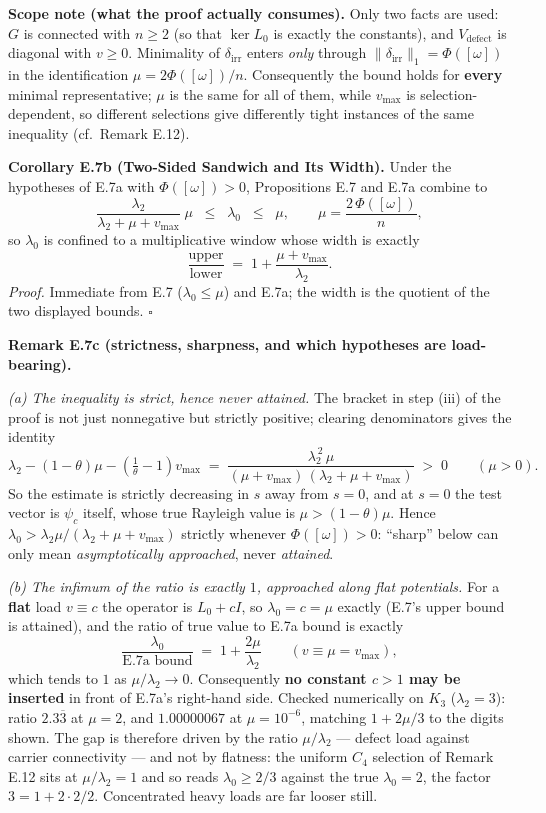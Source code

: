 \documentclass[
]{article}
\begin{document}
\textbf{Scope note (what the proof actually consumes).} Only two facts are used: \(G\) is connected with \(n \ge 2\) (so that \(\ker L_0\) is exactly the constants), and \(V_{\mathrm{defect}}\) is diagonal with \(v \ge 0\). Minimality of \(\delta_{\mathrm{irr}}\) enters \emph{only} through \(\|\delta_{\mathrm{irr}}\|_1 = \Phi([\omega])\) in the identification \(\mu = 2\Phi([\omega])/n\). Consequently the bound holds for \textbf{every} minimal representative; \(\mu\) is the same for all of them, while \(v_{\max}\) is selection-dependent, so different selections give differently tight instances of the same inequality (cf.~Remark E.12).

\textbf{Corollary E.7b (Two-Sided Sandwich and Its Width).} Under the hypotheses of E.7a with \(\Phi([\omega]) > 0\), Propositions E.7 and E.7a combine to
\[\frac{\lambda_2}{\lambda_2+\mu+v_{\max}}\;\mu \;\;\le\;\; \lambda_0 \;\;\le\;\; \mu, \qquad \mu = \frac{2\,\Phi([\omega])}{n},\]
so \(\lambda_0\) is confined to a multiplicative window whose width is exactly
\[\frac{\text{upper}}{\text{lower}} \;=\; 1 + \frac{\mu + v_{\max}}{\lambda_2}.\]
\emph{Proof.} Immediate from E.7 (\(\lambda_0 \le \mu\)) and E.7a; the width is the quotient of the two displayed bounds. \(\square\)

\textbf{Remark E.7c (strictness, sharpness, and which hypotheses are load-bearing).}

\emph{(a) The inequality is strict, hence never attained.} The bracket in step (iii) of the proof is not just nonnegative but strictly positive; clearing denominators gives the identity
\[\lambda_2 - (1-\theta)\mu - \left(\tfrac1\theta-1\right)v_{\max} \;=\; \frac{\lambda_2^{\,2}\,\mu}{(\mu+v_{\max})\,(\lambda_2+\mu+v_{\max})} \;>\; 0 \qquad (\mu > 0).\]
So the estimate is strictly decreasing in \(s\) away from \(s=0\), and at \(s=0\) the test vector is \(\psi_c\) itself, whose true Rayleigh value is \(\mu > (1-\theta)\mu\). Hence \(\lambda_0 > \lambda_2\mu/(\lambda_2+\mu+v_{\max})\) strictly whenever \(\Phi([\omega])>0\): ``sharp'' below can only mean \emph{asymptotically approached}, never \emph{attained}.

\emph{(b) The infimum of the ratio is exactly \(1\), approached along flat potentials.} For a \textbf{flat} load \(v \equiv c\) the operator is \(L_0 + cI\), so \(\lambda_0 = c = \mu\) exactly (E.7's upper bound is attained), and the ratio of true value to E.7a bound is exactly
\[\frac{\lambda_0}{\text{E.7a bound}} \;=\; 1 + \frac{2\mu}{\lambda_2} \qquad (v \equiv \mu = v_{\max}),\]
which tends to \(1\) as \(\mu/\lambda_2 \to 0\). Consequently \textbf{no constant \(c > 1\) may be inserted} in front of E.7a's right-hand side. Checked numerically on \(K_3\) (\(\lambda_2 = 3\)): ratio \(2.3\overline{3}\) at \(\mu = 2\), and \(1.00000067\) at \(\mu = 10^{-6}\), matching \(1 + 2\mu/3\) to the digits shown.
The gap is therefore driven by the ratio \(\mu/\lambda_2\) --- defect load against carrier connectivity --- and not by flatness: the uniform \(C_4\) selection of Remark E.12 sits at \(\mu/\lambda_2 = 1\) and so reads \(\lambda_0 \ge 2/3\) against the true \(\lambda_0 = 2\), the factor \(3 = 1 + 2\cdot 2/2\). Concentrated heavy loads are far looser still.
\end{document}
